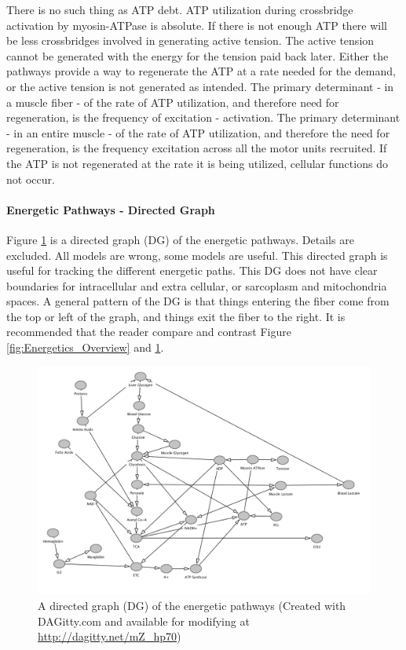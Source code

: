 There is no such thing as ATP debt. ATP utilization during crossbridge activation by myosin-ATPase is absolute. If there is not enough ATP there will be less crossbridges involved in generating active tension. The active tension cannot be generated with the energy for the tension paid back later. Either the pathways provide a way to regenerate the ATP at a rate needed for the demand, or the active tension is not generated as intended. The primary determinant - in a muscle fiber - of the rate of ATP utilization, and therefore need for regeneration, is the frequency of excitation - activation. The primary determinant - in an entire muscle - of the rate of ATP utilization, and therefore the need for regeneration, is the frequency excitation across all the motor units recruited. If the ATP is not regenerated at the rate it is being utilized, cellular functions do not occur. 

\paragraph{Energetic Pathways - Directed Graph}

Figure \ref{fig:energetic_paths} is a directed graph (DG) of the energetic pathways. Details are excluded. All models are wrong, some models are useful. This directed graph is useful for tracking the different energetic paths. This DG does not have clear boundaries for intracellular and extra cellular, or sarcoplasm and mitochondria spaces. A general pattern of the DG is that things entering the fiber come from the top or left of the graph, and things exit the fiber to the right. It is recommended that the reader compare and contrast Figure \ref{fig:Energetics_Overview} and \ref{fig:energetic_paths}. 

\begin{figure}[!h]
    \centering
    \includegraphics[width=1\linewidth]{./figure/energetic_paths.png}
    \caption{A directed graph (DG) of the energetic pathways (\footnotesize{Created with DAGitty.com and available for modifying at \url{http://dagitty.net/mZ_hp70}})}
    \label{fig:energetic_paths}
\end{figure}




